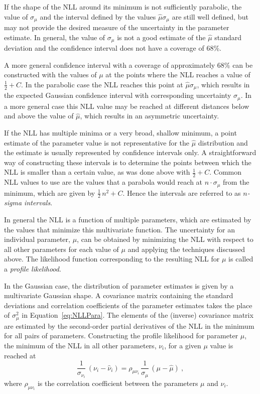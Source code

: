 If the shape of the NLL around its minimum is not sufficiently parabolic, the value of $\sigma_\mu$ and the interval defined by the values
$\hat{\mu}$\textpm$\sigma_\mu$ are still well defined, but may not provide the desired measure of the uncertainty in the parameter
estimate.  In general, the value of $\sigma_\mu$ is not a good estimate of the $\hat{\mu}$ standard deviation and the confidence interval
does not have a coverage of 68\%.

A more general confidence interval with a coverage of approximately 68\% can be constructed with the values of $\mu$ at the points where
the NLL reaches a value of $\tfrac{1}{2}+C$. In the parabolic case the NLL reaches this point at $\hat{\mu}$\textpm$\sigma_\mu$, which
results in the expected Gaussian confidence interval with corresponding uncertainty $\sigma_\mu$. In a more general case this NLL value
may be reached at different distances below and above the value of $\hat{\mu}$, which results in an asymmetric uncertainty.

If the NLL has multiple minima or a very broad, shallow minimum, a point estimate of the parameter value is not representative for the
$\hat{\mu}$ distribution and the estimate is usually represented by confidence intervals only. A straightforward way of constructing these
intervals is to determine the points between which the NLL is smaller than a certain value, as was done above with $\tfrac{1}{2}+C$. Common
NLL values to use are the values that a parabola would reach at $n\cdot\sigma_\mu$ from the minimum, which are given by
$\tfrac{1}{2}\,n^2+C$. Hence the intervals are referred to as \emph{$n$-sigma intervals}.

In general the NLL is a function of multiple parameters, which are estimated by the values that minimize this multivariate function.  The
uncertainty for an individual parameter, $\mu$, can be obtained by minimizing the NLL with respect to all other parameters for each value
of $\mu$ and applying the techniques discussed above. The likelihood function corresponding to the resulting NLL for $\mu$ is called a
\emph{profile likelihood}.

In the Gaussian case, the distribution of parameter estimates is given by a multivariate Gaussian shape. A covariance matrix containing the
standard deviations and correlation coefficients of the parameter estimates takes the place of $\sigma_\mu^2$ in Equation~\ref{eq:NLLPara}.
The elements of the (inverse) covariance matrix are estimated by the second-order partial derivatives of the NLL in the minimum for all
pairs of parameters. Constructing the profile likelihood for parameter $\mu$, the minimum of the NLL in all other parameters, $\nu_i$, for
a given $\mu$ value is reached at
\begin{equation}
  \frac{1}{\sigma_{\nu_i}}\, (\nu_i-\hat{\nu}_i)  = \rho_{\mu\nu_i}\, \frac{1}{\sigma_\mu}\, (\mu-\hat{\mu})\ ,
\end{equation}
where $\rho_{\mu\nu_i}$ is the correlation coefficient between the parameters $\mu$ and $\nu_i$.


